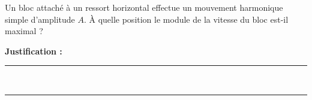 Un bloc attaché à un ressort horizontal effectue un mouvement harmonique simple d'amplitude $A$. À quelle position le module de la vitesse du bloc est-il maximal ?

\choices

\noindent\textbf{Justification :} \hrulefill \\[2.5ex]
\rule{\linewidth}{0.4pt} \\[2.5ex]
\rule{\linewidth}{0.4pt}
\vfill
